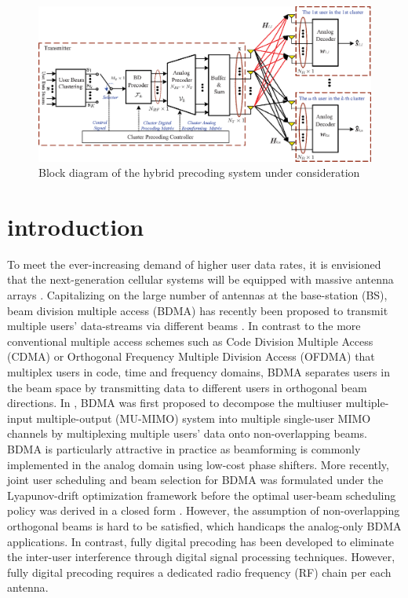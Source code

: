 \documentclass[conference]{IEEEtran}
\begin{document}
\begin{figure}[t]
\centering
\begin{minipage}[t]{0.7\linewidth}
	\includegraphics[width=5.6in]{PPTFigure/BlockDiagonal.eps}
	\caption{Block diagram of the hybrid precoding system under consideration}\label{fig:BlockDiagram}
\end{minipage}
\end{figure}

\section{introduction}
To meet the ever-increasing demand of higher user data rates, it is envisioned that the next-generation cellular systems will be equipped with massive antenna arrays \cite{boccardi2014five}. Capitalizing on the large number of antennas at the base-station (BS), beam division multiple access (BDMA) has recently been proposed to transmit multiple users' data-streams via different beams \cite{sun2015beam, Jiang2018}. In contrast to the more conventional multiple access schemes such as Code Division Multiple Access (CDMA) or Orthogonal Frequency Multiple Division Access (OFDMA) that multiplex users in code, time and frequency domains, BDMA separates users in the beam space by transmitting data to different users in orthogonal beam directions. In \cite{sun2015beam}, BDMA was first proposed to decompose the multiuser multiple-input multiple-output (MU-MIMO) system into multiple single-user MIMO channels by multiplexing multiple users' data onto non-overlapping beams. BDMA is particularly attractive in practice as beamforming is commonly implemented in the analog domain using low-cost phase shifters. More recently, joint user scheduling and beam selection for BDMA was formulated under the Lyapunov-drift optimization framework before the optimal user-beam scheduling policy was derived in a closed form \cite{Jiang2018}. However, the assumption of non-overlapping orthogonal beams is hard to be satisfied, which handicaps the analog-only BDMA applications. In contrast, fully digital precoding has been developed to eliminate the inter-user interference through digital signal processing techniques. However, fully digital precoding requires a dedicated radio frequency (RF) chain per each antenna\cite{bogale2014beamforming}.
\end{document}
